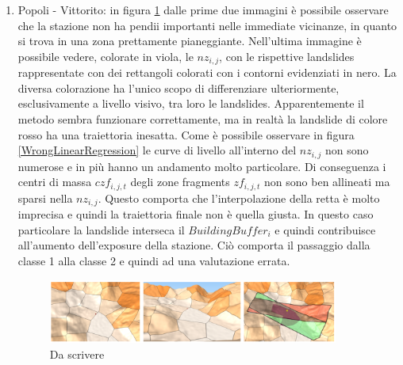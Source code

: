\begin{enumerate}
	\item Popoli - Vittorito: in figura \ref{Popoli_Final} dalle prime due immagini è possibile osservare che la stazione non ha pendii importanti nelle immediate vicinanze, in quanto si trova in una zona prettamente pianeggiante. Nell'ultima immagine è possibile vedere, colorate in viola, le $nz_{i,j}$, con le rispettive landslides rappresentate con dei rettangoli colorati con i contorni evidenziati in nero. La diversa colorazione ha l'unico scopo di differenziare ulteriormente, esclusivamente a livello visivo, tra loro le landslides. Apparentemente il metodo sembra funzionare correttamente, ma in realtà la landslide di colore rosso ha una traiettoria inesatta. Come è possibile osservare in figura \ref{WrongLinearRegression} le curve di livello all'interno del $nz_{i,j}$ non sono numerose e in più hanno un andamento molto particolare. Di conseguenza i centri di massa $czf_{i,j,t}$ degli zone fragments $zf_{i,j,t}$ non sono ben allineati ma sparsi nella $nz_{i,j}$. Questo comporta che l'interpolazione della retta è molto imprecisa e quindi la traiettoria finale non è quella giusta. In questo caso particolare la landslide interseca il $BuildingBuffer_i$ e quindi contribuisce all'aumento dell'exposure della stazione. Ciò comporta il passaggio dalla classe 1 alla classe 2 e quindi ad una valutazione errata.
	\begin{figure}[h]
		\centering
		\includegraphics[width=0.9\textwidth]{images/PopoliFinal}
		\caption{Da scrivere}
		\label{Popoli_Final}
	\end{figure}
	

\end{enumerate}

